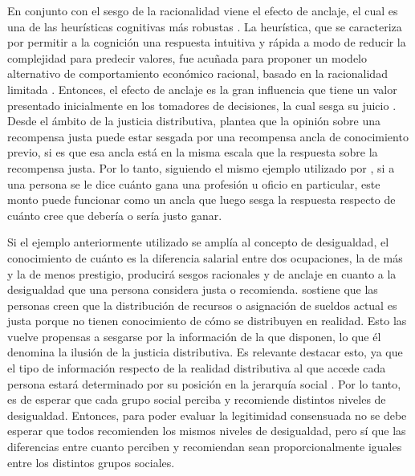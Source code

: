 \documentclass[12pt]{article}
\begin{document}
En conjunto con el sesgo de la racionalidad viene el efecto de anclaje, el cual es una de las heurísticas cognitivas más robustas \citep{Furnham2011}. La heurística, que se caracteriza por permitir a la cognición una respuesta intuitiva y rápida a modo de reducir la complejidad para predecir valores, fue acuñada para proponer un modelo alternativo de comportamiento económico racional, basado en la racionalidad limitada \citep{Simon1955}. Entonces, el efecto de anclaje es la gran influencia que tiene un valor presentado inicialmente en los tomadores de decisiones, la cual sesga su juicio \citep{Tversky1974}. Desde el ámbito de la justicia distributiva, \cite{Markovsky1988} plantea que la opinión sobre una recompensa justa puede estar sesgada por una recompensa ancla de conocimiento previo, si es que esa ancla está en la misma escala que la respuesta sobre la recompensa justa. Por lo tanto, siguiendo el mismo ejemplo utilizado por \cite{Trump2017}, si a una persona se le dice cuánto gana una profesión u oficio en particular, este monto puede funcionar como un ancla que luego sesga la respuesta respecto de cuánto cree que debería o sería justo ganar. 

Si el ejemplo anteriormente utilizado se amplía al concepto de desigualdad, el conocimiento de cuánto es la diferencia salarial entre dos ocupaciones, la de más y la de menos prestigio, producirá sesgos racionales y de anclaje en cuanto a la desigualdad que una persona considera justa o recomienda. \cite{Wegener1987} sostiene que las personas creen que la distribución de recursos o asignación de sueldos actual es justa porque no tienen conocimiento de cómo se distribuyen en realidad. Esto las vuelve propensas a sesgarse por la información de la que disponen, lo que él denomina la ilusión de la justicia distributiva. Es relevante destacar esto, ya que el tipo de información respecto de la realidad distributiva al que accede cada persona estará determinado por su posición en la jerarquía social \citep{Castillo2011}. Por lo tanto, es de esperar que cada grupo social perciba y recomiende distintos niveles de desigualdad. Entonces, para poder evaluar la legitimidad consensuada no se debe esperar que todos recomienden los mismos niveles de desigualdad, pero sí que las diferencias entre cuanto perciben y recomiendan sean proporcionalmente iguales entre los distintos grupos sociales. 
\end{document}
